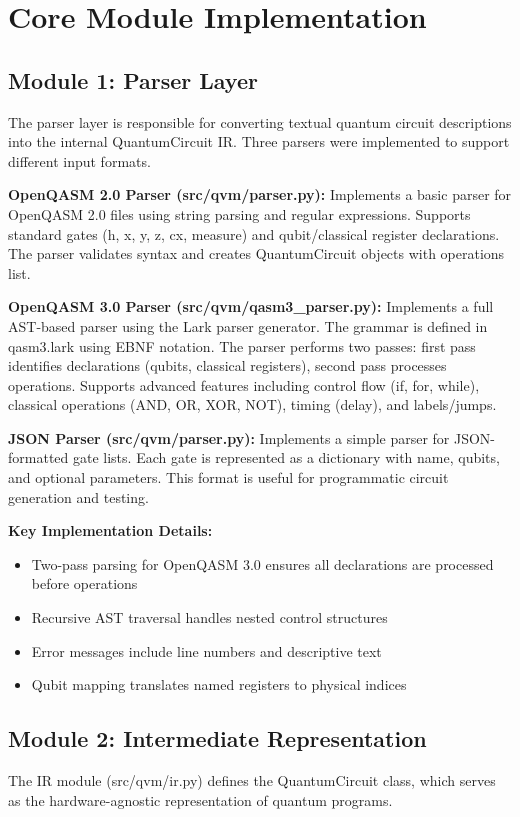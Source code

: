 \section{Core Module Implementation}

\subsection{Module 1: Parser Layer}
The parser layer is responsible for converting textual quantum circuit descriptions into the internal QuantumCircuit IR. Three parsers were implemented to support different input formats.

\textbf{OpenQASM 2.0 Parser (src/qvm/parser.py):}
Implements a basic parser for OpenQASM 2.0 files using string parsing and regular expressions. Supports standard gates (h, x, y, z, cx, measure) and qubit/classical register declarations. The parser validates syntax and creates QuantumCircuit objects with operations list.

\textbf{OpenQASM 3.0 Parser (src/qvm/qasm3\_parser.py):}
Implements a full AST-based parser using the Lark parser generator. The grammar is defined in qasm3.lark using EBNF notation. The parser performs two passes: first pass identifies declarations (qubits, classical registers), second pass processes operations. Supports advanced features including control flow (if, for, while), classical operations (AND, OR, XOR, NOT), timing (delay), and labels/jumps.

\textbf{JSON Parser (src/qvm/parser.py):}
Implements a simple parser for JSON-formatted gate lists. Each gate is represented as a dictionary with name, qubits, and optional parameters. This format is useful for programmatic circuit generation and testing.

\textbf{Key Implementation Details:}
\begin{itemize}
\item Two-pass parsing for OpenQASM 3.0 ensures all declarations are processed before operations
\item Recursive AST traversal handles nested control structures
\item Error messages include line numbers and descriptive text
\item Qubit mapping translates named registers to physical indices
\end{itemize}

\subsection{Module 2: Intermediate Representation}
The IR module (src/qvm/ir.py) defines the QuantumCircuit class, which serves as the hardware-agnostic representation of quantum programs.

